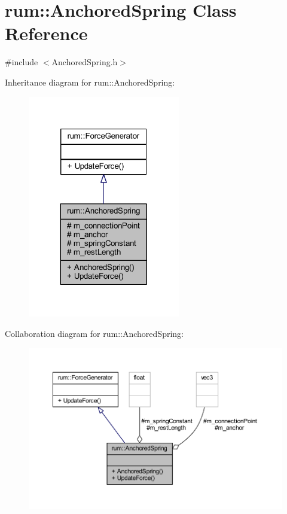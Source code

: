 \hypertarget{classrum_1_1_anchored_spring}{}\section{rum\+:\+:Anchored\+Spring Class Reference}
\label{classrum_1_1_anchored_spring}


{\ttfamily \#include $<$Anchored\+Spring.\+h$>$}



Inheritance diagram for rum\+:\+:Anchored\+Spring\+:\nopagebreak
\begin{figure}[H]
\begin{center}
\leavevmode
\includegraphics[width=188pt]{classrum_1_1_anchored_spring__inherit__graph}
\end{center}
\end{figure}


Collaboration diagram for rum\+:\+:Anchored\+Spring\+:\nopagebreak
\begin{figure}[H]
\begin{center}
\leavevmode
\includegraphics[width=350pt]{classrum_1_1_anchored_spring__coll__graph}
\end{center}
\end{figure}
